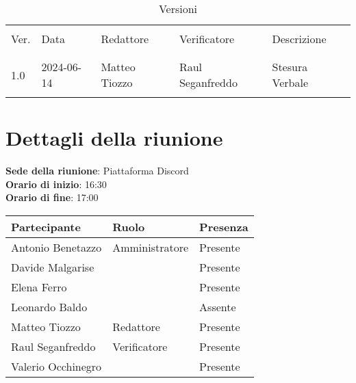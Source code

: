 \documentclass[italian,12pt]{article}
\begin{document}
\newcommand{\mySkip}[1][]{#1}



\newpage



\begin{table}[!h]
	\caption{Versioni}
	\footnotesize
	\begin{center}
		\begin{tabular}{ l l l l p{6cm} }
			\hline                                                                              \\[-2ex]
			Ver. & Data       & Redattore          & Verificatore       & Descrizione           \\
			\\[-2ex] \hline \\[-1.5ex]
			1.0  & 2024-06-14 & Matteo Tiozzo      & Raul Seganfreddo   & Stesura Verbale       \\
			\\[-1.5ex] \hline
		\end{tabular}
	\end{center}
\end{table}

\newpage

\tableofcontents

\newpage

\section{Dettagli della riunione}

\textbf{Sede della riunione}: Piattaforma Discord\\
\textbf{Orario di inizio}: 16:30\\
\textbf{Orario di fine}: 17:00\\

\begin{flushleft}
	\begin{table}[!h]
	\begin{tabular}{ |l|l|l| } 
		\hline
		\textbf{Partecipante} & \textbf{Ruolo}       & \textbf{Presenza} \\
		\hline 
		Antonio Benetazzo     & Amministratore       & Presente          \\
		Davide Malgarise      &                      & Presente          \\
		Elena Ferro           &                      & Presente          \\
		Leonardo Baldo        &                      & Assente           \\
		Matteo Tiozzo         & Redattore            & Presente          \\
		Raul Seganfreddo      & Verificatore         & Presente          \\
		Valerio Occhinegro    &                      & Presente          \\
		\hline
	\end{tabular}
	\end{table}
\end{flushleft}
\end{document}
